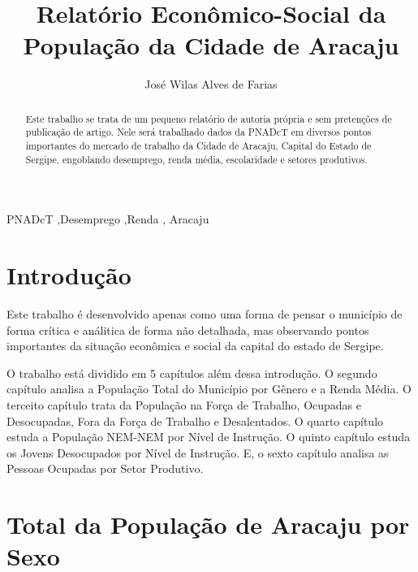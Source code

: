 \documentclass[preprint, 3p,
authoryear]{elsarticle} %
\begin{document}
\begin{frontmatter}

  \title{Relatório Econômico-Social da População da Cidade de Aracaju}
    \author[Universidade Federal de Sergipe 1]{José Wilas Alves de
Farias%
  }
  
  \begin{abstract}
  Este trabalho se trata de um pequeno relatório de autoria própria e
  sem pretenções de publicação de artigo. Nele será trabalhado dados da
  PNADcT em diversos pontos importantes do mercado de trabalho da Cidade
  de Aracaju, Capital do Estado de Sergipe, engoblando desemprego, renda
  média, escolaridade e setores produtivos.
  \end{abstract}
    \begin{keyword}
    PNADcT \sep Desemprego \sep Renda \sep 
    Aracaju
  \end{keyword}
  
 \end{frontmatter}

\hypertarget{introduuxe7uxe3o}{%
\section{Introdução}\label{introduuxe7uxe3o}}

Este trabalho é desenvolvido apenas como uma forma de pensar o município
de forma crítica e análitica de forma não detalhada, mas observando
pontos importantes da situação econômica e social da capital do estado
de Sergipe.

O trabalho está dividido em 5 capítulos além dessa introdução. O segundo
capítulo analisa a População Total do Município por Gênero e a Renda
Média. O terceito capítulo trata da População na Força de Trabalho,
Ocupadas e Desocupadas, Fora da Força de Trabalho e Desalentados. O
quarto capítulo estuda a População NEM-NEM por Nível de Instrução. O
quinto capítulo estuda os Jovens Desocupados por Nível de Instrução. E,
o sexto capítulo analisa as Pessoas Ocupadas por Setor Produtivo.

\hypertarget{total-da-populauxe7uxe3o-de-aracaju-por-sexo}{%
\section{Total da População de Aracaju por
Sexo}\label{total-da-populauxe7uxe3o-de-aracaju-por-sexo}}
\end{document}
